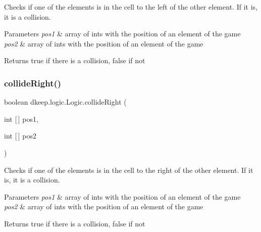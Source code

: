 Checks if one of the elements is in the cell to the left of the other element. If it is, it is a collision. 
\begin{DoxyParams}{Parameters}
{\em pos1} & array of ints with the position of an element of the game \\
\hline
{\em pos2} & array of ints with the position of an element of the game \\
\hline
\end{DoxyParams}
\begin{DoxyReturn}{Returns}
true if there is a collision, false if not 
\end{DoxyReturn}
\mbox{\label{classdkeep_1_1logic_1_1_logic_af55798f2e54446a1df0ebed4319f78bf}} 
\subsubsection{\texorpdfstring{collide\+Right()}{collideRight()}}
{\footnotesize\ttfamily boolean dkeep.\+logic.\+Logic.\+collide\+Right (\begin{DoxyParamCaption}\item[{int \mbox{[}$\,$\mbox{]}}]{pos1,  }\item[{int \mbox{[}$\,$\mbox{]}}]{pos2 }\end{DoxyParamCaption})}

Checks if one of the elements is in the cell to the right of the other element. If it is, it is a collision. 
\begin{DoxyParams}{Parameters}
{\em pos1} & array of ints with the position of an element of the game \\
\hline
{\em pos2} & array of ints with the position of an element of the game \\
\hline
\end{DoxyParams}
\begin{DoxyReturn}{Returns}
true if there is a collision, false if not 
\end{DoxyReturn}
\mbox{\label{classdkeep_1_1logic_1_1_logic_af2fb54584f4206e935755e4bc5afce81}} 
